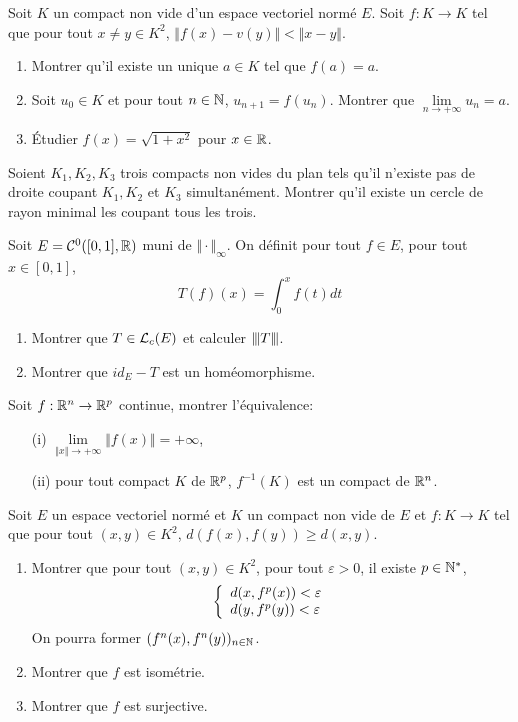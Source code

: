 \begin{exercise}
	Soit $K$ un compact non vide d'un espace vectoriel normé $E$. Soit $f\colon K\to K$ tel que pour tout $x\neq y\in K^{2}$, $\Vert f(x)-v(y)\Vert<\Vert x-y\Vert$.
	\begin{enumerate}
		\item Montrer qu'il existe un unique $a\in K$ tel que $f(a)=a$.
		\item Soit $u_{0}\in K$ et pour tout $n\in\mathbb{N}$, $u_{n+1}=f(u_{n})$. Montrer que $\lim\limits_{n\to+\infty}u_{n}=a$.
		\item Étudier $f(x)=\sqrt{1+x^{2}}$ pour $x\in\mathbb{R}$.
	\end{enumerate}
\end{exercise}

\begin{exercise}
	Soient $K_{1},K_{2},K_{3}$ trois compacts non vides du plan tels qu'il n'existe pas de droite coupant $K_{1},K_{2}$ et $K_{3}$ simultanément. Montrer qu'il existe un cercle de rayon minimal les coupant tous les trois.
\end{exercise}

\begin{exercise}
	Soit $E=\mathcal{C}^{0}([0,1],\mathbb{R})$ muni de $\Vert\cdot\Vert_{\infty}$. On définit pour tout $f\in E$, pour tout $x\in[0,1]$, 
	$$T(f)(x)=\int_{0}^{x}f(t)dt$$
	\begin{enumerate}
		\item Montrer que $T\in\mathcal{L}_{c}(E)$ et calculer ${\left\vert\kern-0.25ex\left\vert\kern-0.25ex\left\vert{}T \right\vert\kern-0.25ex\right\vert\kern-0.25ex\right\vert}$.
		\item Montrer que $id_{E}-T$ est un homéomorphisme.
	\end{enumerate}
\end{exercise}

\begin{exercise}
	Soit $f:\mathbb{R}^{n}\to\mathbb{R}^{p}$ continue, montrer l'équivalence:
	\begin{enumerate}
		\item [(i)] $\lim\limits_{\Vert x\Vert\to+\infty}\Vert f(x)\Vert=+\infty$,
		\item [(ii)] pour tout compact $K$ de $\mathbb{R}^{p}$, $f^{-1}(K)$ est un compact de $\mathbb{R}^{n}$.
	\end{enumerate}
\end{exercise}

\begin{exercise}
	Soit $E$ un espace vectoriel normé et $K$ un compact non vide de $E$ et $f:K\to K$ tel que pour tout $(x,y)\in K^{2}$, $d(f(x),f(y))\geqslant d(x,y)$.
	\begin{enumerate}
		\item Montrer que pour tout $(x,y)\in K^{2}$, pour tout $\varepsilon>0$, il existe $p\in\mathbb{N}^{*}$,
		$$
		\left\{
			\begin{array}[]{l}
				d(x,f^{p}(x))<\varepsilon\\
				d(y,f^{p}(y))<\varepsilon
			\end{array}
		\right.
		$$
		On pourra former $(f^{n}(x),f^{n}(y))_{n\in\mathbb{N}}$.
		\item Montrer que $f$ est isométrie.
		\item Montrer que $f$ est surjective.
	\end{enumerate}
\end{exercise}

